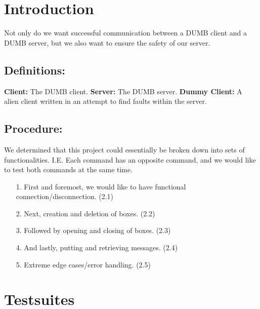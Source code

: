 \documentclass{article}
\title{\vspace{-0.5cm}\titletext}
\date{\vspace{-5ex}}
\begin{document}
    \maketitle
    \thispagestyle{fancy}
    \vspace{-1.0cm}

    \section{Introduction}
        Not only do we want successful communication between a DUMB client and a DUMB server, but we also want to ensure the safety of our server.
        \subsection{Definitions:}
            \textbf{Client:} The DUMB client. \newline
            \textbf{Server:} The DUMB server. \newline
            \textbf{Dummy Client:} A alien client written in an attempt to find faults within the server.
        \subsection{Procedure:} 
            We determined that this project could essentially be broken down into sets of functionalities. I.E. Each command has an opposite command, and we would like to test both commands at the same time.
            \begin{itemize}
                \item[1.] First and foremost, we would like to have functional connection/disconnection. (2.1)
                \item[2.] Next, creation and deletion of boxes. (2.2)
                \item[3.] Followed by opening and closing of boxes. (2.3)
                \item[4.] And lastly, putting and retrieving messages. (2.4)
                \item[5.] Extreme edge cases/error handling. (2.5) 
            \end{itemize}
    \section{Testsuites}
\end{document}
